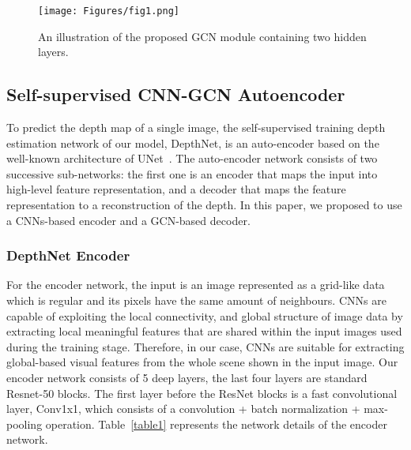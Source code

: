 \documentclass[journal]{IEEEtran}
\begin{document}
\begin{figure}[!h]
\centering
\texttt{[image: Figures/fig1.png]}
\caption{An illustration of the proposed GCN module containing two hidden layers.}
\label{fig1}
\end{figure}

\subsection{Self-supervised CNN-GCN Autoencoder}
To predict the depth map of a single image, the self-supervised training depth estimation network of our model, DepthNet, is an auto-encoder based on the well-known architecture of UNet~\cite{ronneberger2015u}. The auto-encoder network consists of two successive sub-networks: the first one is an encoder that maps the input into high-level feature representation, and a decoder that maps the feature representation to a reconstruction of the depth. In this paper, we proposed to use a CNNs-based encoder and a GCN-based decoder.

\subsubsection{DepthNet Encoder}
For the encoder network, the input is an image represented as a grid-like data which is regular and its pixels have the same amount of neighbours. CNNs are capable of exploiting the local connectivity, and global structure of image data by extracting local meaningful features that are shared within the input images used during the training stage. Therefore, in our case, CNNs are suitable for extracting global-based visual features from the whole scene shown in the input image. Our encoder network consists of 5 deep layers, the last four layers are standard Resnet-50 \cite{He2016} blocks. The first layer before the ResNet blocks is a fast convolutional layer, Conv1x1, which consists of a convolution + batch normalization + max-pooling operation. Table~\ref{table1} represents the network details of the encoder network. 
\end{document}
